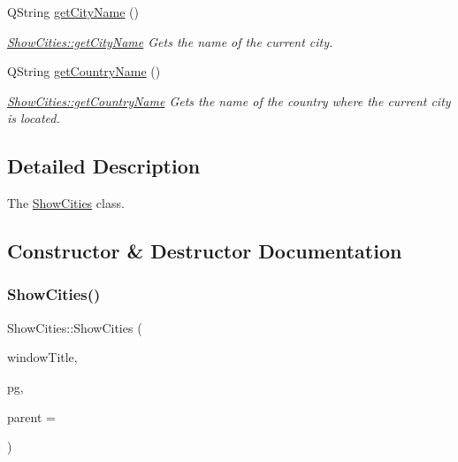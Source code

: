 \begin{DoxyCompactItemize}
Q\+String \mbox{\hyperlink{class_show_cities_a3640b91c66939d0070c3dd6f5b9eb93c}{get\+City\+Name}} ()
\begin{DoxyCompactList}\small\item\em \mbox{\hyperlink{class_show_cities_a3640b91c66939d0070c3dd6f5b9eb93c}{Show\+Cities\+::get\+City\+Name}} Gets the name of the current city. \end{DoxyCompactList}\item 
Q\+String \mbox{\hyperlink{class_show_cities_a93cf32e7ef19a182d0022c9c888392aa}{get\+Country\+Name}} ()
\begin{DoxyCompactList}\small\item\em \mbox{\hyperlink{class_show_cities_a93cf32e7ef19a182d0022c9c888392aa}{Show\+Cities\+::get\+Country\+Name}} Gets the name of the country where the current city is located. \end{DoxyCompactList}\end{DoxyCompactItemize}


\subsection{Detailed Description}
The \mbox{\hyperlink{class_show_cities}{Show\+Cities}} class. 

\subsection{Constructor \& Destructor Documentation}
\mbox{\label{class_show_cities_a71a514390bebd22b5e6ecbb6b731979a}} 
\subsubsection{\texorpdfstring{Show\+Cities()}{ShowCities()}}
{\footnotesize\ttfamily Show\+Cities\+::\+Show\+Cities (\begin{DoxyParamCaption}\item[{Q\+String}]{window\+Title,  }\item[{\mbox{\hyperlink{classpsql}{psql}} $\ast$}]{pg,  }\item[{Q\+Widget $\ast$}]{parent = {} }\end{DoxyParamCaption})\hspace{0.3cm}{\ttfamily [explicit]}}



